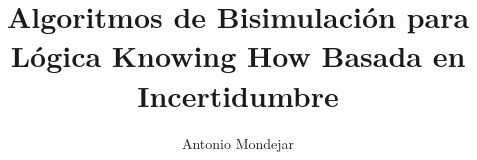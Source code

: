 \documentclass[a4paper,12pt,oneside,openright]{report}
\begin{document}
\title{Algoritmos de Bisimulación para Lógica Knowing How Basada en Incertidumbre}

\author{Antonio Mondejar}

\maketitle

{\hypersetup{linkcolor=black}%
\tableofcontents}
\cleardoublepage






        







\end{document}
